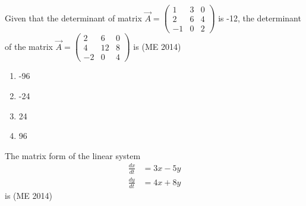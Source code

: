 \item  Given that the determinant of matrix \( \vec{A} = \begin{pmatrix} 1 & 3 & 0 \\ 2 & 6 & 4 \\ -1 & 0 &  2 \end{pmatrix} \) is -12, the determinant of the matrix \( \vec{A} = \begin{pmatrix} 2 & 6 & 0 \\ 4 & 12 & 8 \\ -2 & 0 & 4 \end{pmatrix} \) is 
\hfill{(ME 2014)}
 \begin{multicols}{4}
 \begin{enumerate}
         \item -96
         \item -24
         \item 24
         \item 96
     \end{enumerate}
 \end{multicols}
\item The matrix form of the linear system 
    \begin{align*}
	    \frac{dx}{dt}&=3x-5y 
	    \\
	    \frac{dy}{dt}&=4x+8y 
    \end{align*}
is
\hfill{(ME 2014)}
